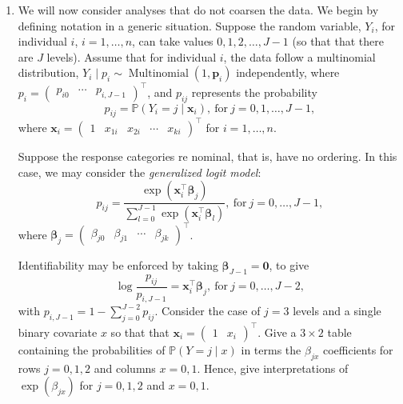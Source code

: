 \documentclass[letterpaper,11pt]{article}
\begin{document}
\begin{enumerate}
\item We will now consider analyses that do not coarsen the data. We begin by
  defining notation in a generic situation. Suppose the random variable, $Y_i$,
  for individual $i$, $i = 1,\ldots,n$, can take values $0,1,2,\ldots,J-1$ (so
  that that there are $J$ levels). Assume that for individual $i$, the data
  follow a multinomial distribution,
  $Y_i \mid p_i \sim \operatorname{Multinomial}\left(1,\mathbf{p}_i\right)$
  independently, where $p_i = \begin{pmatrix}p_{i0} & \cdots & p_{i,J-1}
  \end{pmatrix}^\intercal$, and $p_{ij}$ represents the probability
  \begin{equation}
    p_{ij} = \mathbb{P}\left(Y_i = j \mid \mathbf{x}_i\right),
    ~\text{for}~j=0,1,\ldots,J-1,
    \label{eqn:p4_pij}
  \end{equation}
  where $\mathbf{x}_i = \begin{pmatrix} 1 & x_{1i} & x_{2i} & \cdots & x_{ki}
  \end{pmatrix}^\intercal$ for $i = 1,\ldots,n$.

  Suppose the response categories re nominal, that is, have no ordering. In this
  case, we may consider the \emph{generalized logit model}:
  \begin{equation}
    p_{ij} = \frac{\exp\left(\mathbf{x}_i^\intercal\bm\beta_j\right)}{
      \sum_{l=0}^{J-1}\exp\left(\mathbf{x}_i^\intercal\bm\beta_l\right)
    },~\text{for}~j=0,\ldots,J-1,
  \end{equation}
  where
  $\bm\beta_j = \begin{pmatrix} \beta_{j0} & \beta_{j1} & \cdots & \beta_{jk}
  \end{pmatrix}^\intercal$.

  Identifiability may be enforced by taking $\bm\beta_{J-1} = \mathbf{0}$, to
  give
  \begin{equation}
    \log\frac{p_{ij}}{p_{i,J-1}} = \mathbf{x}_i^\intercal\bm\beta_j,
    ~\text{for}~j=0,\ldots,J-2,
    \label{eqn:p4_log_odds_ratio}
  \end{equation}
  with $p_{i,J-1} = 1 - \sum_{j=0}^{J-2} p_{ij}$. Consider the case of $j = 3$
  levels and a single binary covariate $x$ so that that
  $\mathbf{x}_i = \begin{pmatrix} 1 & x_i \end{pmatrix}^\intercal$. Give a
  $3 \times 2$ table containing the probabilities of
  $\mathbb{P}\left(Y = j \mid x\right)$ in terms the $\beta_{jx}$ coefficients
  for rows $j = 0,1,2$ and columns $x=0,1$. Hence, give interpretations of
  $\exp\left(\beta_{jx}\right)$ for $j = 0,1,2$ and $x = 0,1$.


\end{enumerate}
\end{document}
